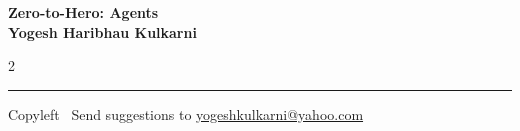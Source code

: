\documentclass[8pt,landscape]{article}
\begin{document}
\footnotesize


\begin{center}
\Large{\textbf{Zero-to-Hero: Agents\\ Yogesh Haribhau Kulkarni}}
\end{center}

\begin{multicols}{2}

\end{multicols}

\rule{\linewidth}{0.25pt}
\scriptsize
Copyleft \textcopyleft\  Send suggestions to
\href{http://www.yogeshkulkarni.com}{yogeshkulkarni@yahoo.com}
\end{document}
